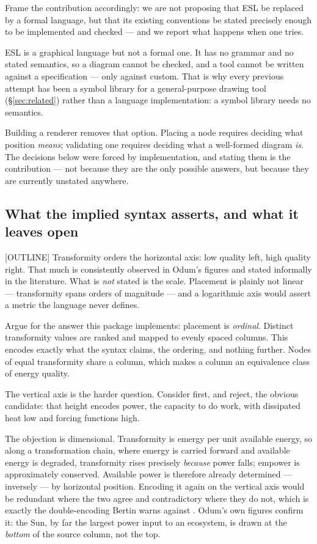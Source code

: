 Frame the contribution accordingly: we are not proposing that ESL be replaced
by a formal language, but that its existing conventions be stated precisely
enough to be implemented and checked --- and we report what happens when one
tries.

ESL is a graphical language but not a formal one. It has no grammar and no
stated semantics, so a diagram cannot be checked, and a tool cannot be written
against a specification --- only against custom. That is why every previous
attempt has been a symbol library for a general-purpose drawing tool
(\S\ref{sec:related}) rather than a language implementation: a symbol library
needs no semantics.

Building a renderer removes that option. Placing a node requires deciding what
position \emph{means}; validating one requires deciding what a well-formed
diagram \emph{is}. The decisions below were forced by implementation, and
stating them is the contribution --- not because they are the only possible
answers, but because they are currently unstated anywhere.

\subsection{What the implied syntax asserts, and what it leaves open}

[OUTLINE] Transformity orders the horizontal axis: low quality left, high
quality right. That much is consistently observed in Odum's figures and stated
informally in the literature. What is \emph{not} stated is the scale. Placement
is plainly not linear --- transformity spans orders of magnitude --- and a
logarithmic axis would assert a metric the language never defines.

Argue for the answer this package implements: placement is \emph{ordinal}.
Distinct transformity values are ranked and mapped to evenly spaced columns.
This encodes exactly what the syntax claims, the ordering, and nothing further.
Nodes of equal transformity share a column, which makes a column an equivalence
class of energy quality.

The vertical axis is the harder question. Consider first, and reject, the
obvious candidate: that height encodes power, the capacity to do work, with
dissipated heat low and forcing functions high.

The objection is dimensional. Transformity is emergy per unit available energy,
so along a transformation chain, where emergy is carried forward and available
energy is degraded, transformity rises precisely \emph{because} power falls;
empower is approximately conserved. Available power is therefore already
determined --- inversely --- by horizontal position. Encoding it again on the
vertical axis would be redundant where the two agree and contradictory where
they do not, which is exactly the double-encoding Bertin warns against
\citep{bertin1983}. Odum's own figures confirm it: the Sun, by far the largest
power input to an ecosystem, is drawn at the \emph{bottom} of the source column,
not the top.

